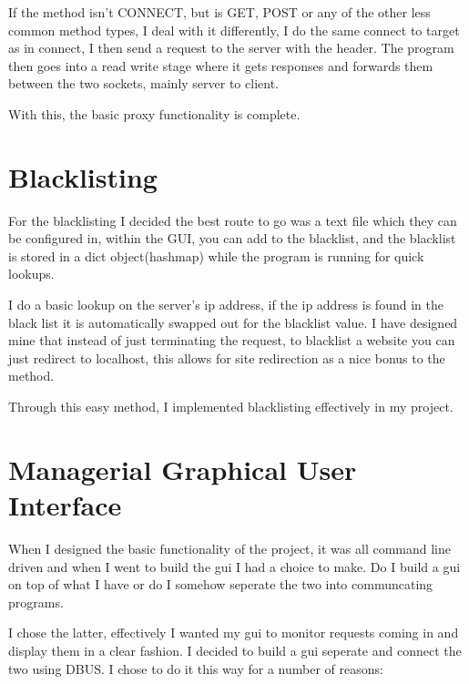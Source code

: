 \documentclass{article}
\begin{document}
If the method isn't CONNECT, but is GET, POST or any of the other less common method types, I deal with it differently, I do the same connect to target as in connect, I then send a request to the server with the header. The program then goes into a read write stage where it gets responses and forwards them between the two sockets, mainly server to client.



With this, the basic proxy functionality is complete.



\section*{ Blacklisting}


For the blacklisting I decided the best route to go was a text file which they can be configured in, within the GUI, you can add to the blacklist, and the blacklist is stored in a dict object(hashmap) while the program is running for quick lookups.



I do a basic lookup on the server's ip address, if the ip address is found in the black list it is automatically swapped out for the blacklist value. I have designed mine that instead of just terminating the request, to blacklist a website you can just redirect to localhost, this allows for site redirection as a nice bonus to the method.



Through this easy method, I implemented blacklisting effectively in my project.



\section*{ Managerial Graphical User Interface}


When I designed the basic functionality of the project, it was all command line driven and when I went to build the gui I had a choice to make. Do I build a gui on top of what I have or do I somehow seperate the two into communcating programs.



I chose the latter, effectively I wanted my gui to monitor requests coming in and display them in a clear fashion. I decided to build a gui seperate and connect the two using DBUS. I chose to do it this way for a number of reasons:
\end{document}
